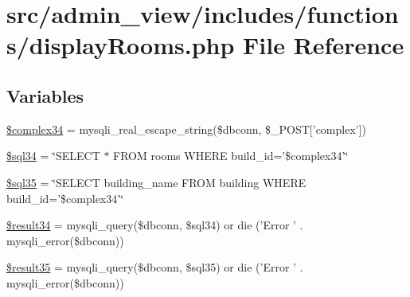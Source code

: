 \hypertarget{displayRooms_8php}{\section{src/admin\-\_\-view/includes/functions/display\-Rooms.php \-File \-Reference}
\label{displayRooms_8php}
}
\subsection*{\-Variables}
\begin{DoxyCompactItemize}
\item 
\hyperlink{displayRooms_8php_ac3ea7ac9c4cf508721396f2df0f2943e}{\$complex34} = mysqli\-\_\-real\-\_\-escape\-\_\-string(\$dbconn, \$\-\_\-\-P\-O\-S\-T\mbox{[}'complex'\mbox{]})
\item 
\hyperlink{displayRooms_8php_aa3036dfed222dfa1b4e1082d67e72987}{\$sql34} = \char`\"{}\-S\-E\-L\-E\-C\-T $\ast$ \-F\-R\-O\-M rooms \-W\-H\-E\-R\-E build\-\_\-id='\$complex34'\char`\"{}
\item 
\hyperlink{displayRooms_8php_a82f8cf7bf047f4e029d5bf5b430b8a6e}{\$sql35} = \char`\"{}\-S\-E\-L\-E\-C\-T building\-\_\-name \-F\-R\-O\-M building \-W\-H\-E\-R\-E build\-\_\-id='\$complex34'\char`\"{}
\item 
\hyperlink{displayRooms_8php_adc77f040461aac6f192259ee524949cc}{\$result34} = mysqli\-\_\-query(\$dbconn, \$sql34) or die ('\-Error ' . mysqli\-\_\-error(\$dbconn))
\item 
\hyperlink{displayRooms_8php_a4bb5768155ac2f9d5bd3b6c91a11c3a9}{\$result35} = mysqli\-\_\-query(\$dbconn, \$sql35) or die ('\-Error ' . mysqli\-\_\-error(\$dbconn))
\end{DoxyCompactItemize}


